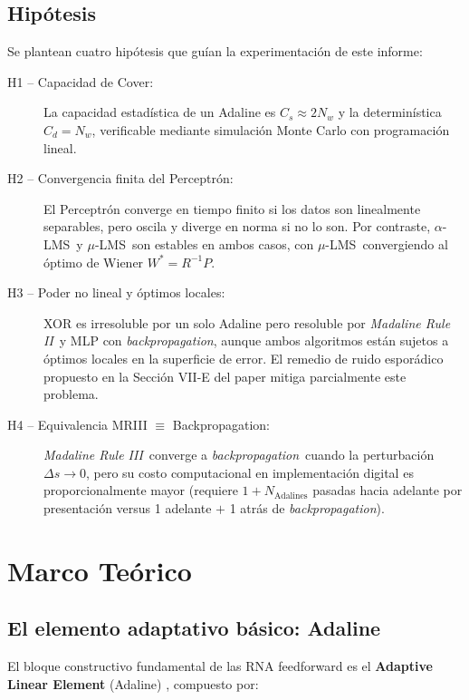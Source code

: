 \documentclass[11pt,a4paper]{article}
\newcommand{\aLMS}{$\alpha$-LMS}
\newcommand{\muLMS}{$\mu$-LMS}
\newcommand{\bp}{\textit{backpropagation}}
\newcommand{\mrii}{\textit{Madaline Rule II}}
\newcommand{\mriii}{\textit{Madaline Rule III}}
\begin{document}
\subsection{Hipótesis}

Se plantean cuatro hipótesis que guían la experimentación de este informe:

\begin{description}
    \item[H1 -- Capacidad de Cover:] La capacidad estadística de un Adaline es $C_s \approx 2N_w$
    y la determinística $C_d = N_w$, verificable mediante simulación Monte Carlo con programación
    lineal.
    \item[H2 -- Convergencia finita del Perceptrón:] El Perceptrón converge en tiempo finito si
    los datos son linealmente separables, pero oscila y diverge en norma si no lo son. Por
    contraste, \aLMS~y \muLMS~son estables en ambos casos, con \muLMS~convergiendo al óptimo de
    Wiener $W^* = R^{-1}P$.
    \item[H3 -- Poder no lineal y óptimos locales:] XOR es irresoluble por un solo Adaline pero
    resoluble por \mrii~y MLP con \bp, aunque ambos algoritmos están sujetos a óptimos locales
    en la superficie de error. El remedio de ruido esporádico propuesto en la Sección VII-E del
    paper \cite{widrow1990} mitiga parcialmente este problema.
    \item[H4 -- Equivalencia MRIII $\equiv$ Backpropagation:] \mriii~converge a \bp~cuando la
    perturbación $\Delta s \to 0$, pero su costo computacional en implementación digital es
    proporcionalmente mayor (requiere $1 + N_{\text{Adalines}}$ pasadas hacia adelante por
    presentación versus 1 adelante $+$ 1 atrás de \bp).
\end{description}

\section{Marco Teórico}

\subsection{El elemento adaptativo básico: Adaline}

El bloque constructivo fundamental de las RNA feedforward es el \textbf{Adaptive Linear Element}
(Adaline) \cite{widrow1990}, compuesto por:
\end{document}
